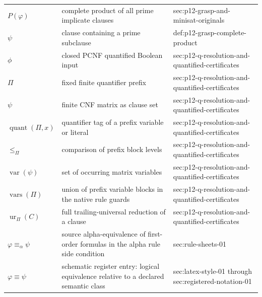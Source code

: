 \begin{longtable}{@{}p{}p{}p{}@{}}
\(P(\varphi)\) & complete product of all prime implicate clauses & sec:\allowbreak{}p12-\allowbreak{}grasp-\allowbreak{}and-\allowbreak{}minisat-\allowbreak{}originals \\
\(\psi\) & clause containing a prime subclause & def:\allowbreak{}p12-\allowbreak{}grasp-\allowbreak{}complete-\allowbreak{}product \\
\(\phi\) & closed PCNF quantified Boolean input & sec:\allowbreak{}p12-\allowbreak{}q-\allowbreak{}resolution-\allowbreak{}and-\allowbreak{}quantified-\allowbreak{}certificates \\
\(\Pi\) & fixed finite quantifier prefix & sec:\allowbreak{}p12-\allowbreak{}q-\allowbreak{}resolution-\allowbreak{}and-\allowbreak{}quantified-\allowbreak{}certificates \\
\(\psi\) & finite CNF matrix as clause set & sec:\allowbreak{}p12-\allowbreak{}q-\allowbreak{}resolution-\allowbreak{}and-\allowbreak{}quantified-\allowbreak{}certificates \\
\(\operatorname{quant}(\Pi,\allowbreak x)\) & quantifier tag of a prefix variable or literal & sec:\allowbreak{}p12-\allowbreak{}q-\allowbreak{}resolution-\allowbreak{}and-\allowbreak{}quantified-\allowbreak{}certificates \\
\(\leq_\Pi\) & comparison of prefix block levels & sec:\allowbreak{}p12-\allowbreak{}q-\allowbreak{}resolution-\allowbreak{}and-\allowbreak{}quantified-\allowbreak{}certificates \\
\(\operatorname{var}(\psi)\) & set of occurring matrix variables & sec:\allowbreak{}p12-\allowbreak{}q-\allowbreak{}resolution-\allowbreak{}and-\allowbreak{}quantified-\allowbreak{}certificates \\
\(\operatorname{vars}(\Pi)\) & union of prefix variable blocks in the native rule guards & sec:\allowbreak{}p12-\allowbreak{}q-\allowbreak{}resolution-\allowbreak{}and-\allowbreak{}quantified-\allowbreak{}certificates \\
\(\operatorname{ur}_{\Pi}(C)\) & full trailing-universal reduction of a clause & sec:\allowbreak{}p12-\allowbreak{}q-\allowbreak{}resolution-\allowbreak{}and-\allowbreak{}quantified-\allowbreak{}certificates \\
\(\varphi\equiv_\alpha\psi\) & source alpha-equivalence of first-order formulas in the alpha rule side condition & sec:\allowbreak{}rule-\allowbreak{}sheets-\allowbreak{}01 \\
\(\varphi\equiv\psi\) & schematic register entry: logical equivalence relative to a declared semantic class & sec:\allowbreak{}latex-\allowbreak{}style-\allowbreak{}01 through sec:\allowbreak{}registered-\allowbreak{}notation-\allowbreak{}01 \\

\end{longtable}
